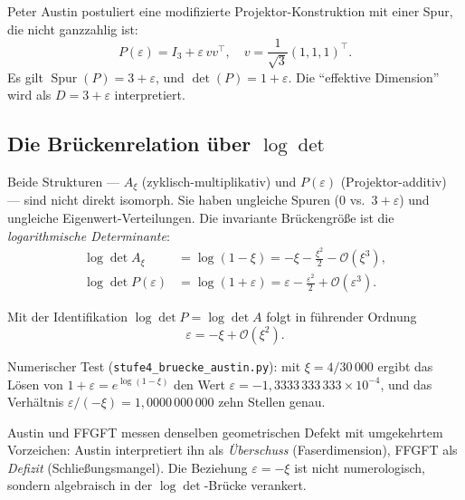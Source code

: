 Peter Austin postuliert eine modifizierte Projektor-Konstruktion mit einer Spur, die nicht ganzzahlig ist:
\begin{equation}
P(\varepsilon) = I_3 + \varepsilon\, vv^\top, \quad v = \frac{1}{\sqrt{3}}(1, 1, 1)^\top.
\label{eq:Paustin}
\end{equation}
Es gilt \(\operatorname{Spur}(P) = 3 + \varepsilon\), und \(\det(P) = 1 + \varepsilon\). Die ``effektive Dimension'' wird als \(D = 3 + \varepsilon\) interpretiert.

\subsection[Die Brückenrelation über log det]{Die Brückenrelation über \(\log \det\)}

Beide Strukturen — \(A_\xi\) (zyklisch-multiplikativ) und \(P(\varepsilon)\) (Projektor-additiv) — sind nicht direkt isomorph. Sie haben ungleiche Spuren (\(0\) vs.~\(3+\varepsilon\)) und ungleiche Eigenwert-Verteilungen. Die invariante Brückengröße ist die \emph{logarithmische Determinante}:
\begin{align}
\log \det A_\xi &= \log(1 - \xi) = -\xi - \frac{\xi^2}{2} - \mathcal{O}(\xi^3),\\
\log \det P(\varepsilon) &= \log(1 + \varepsilon) = \varepsilon - \frac{\varepsilon^2}{2} + \mathcal{O}(\varepsilon^3).
\end{align}

\begin{keyresult}
Mit der Identifikation \(\log \det P = \log \det A\) folgt in führender Ordnung
\begin{equation}
\boxed{\varepsilon = -\xi + \mathcal{O}(\xi^2).}
\label{eq:eps_xi}
\end{equation}
\end{keyresult}

Numerischer Test (\texttt{stufe4\_bruecke\_austin.py}): mit \(\xi = 4/30\,000\) ergibt das Lösen von \(1 + \varepsilon = e^{\log(1-\xi)}\) den Wert \(\varepsilon = -1{,}3333\,333\,333 \times 10^{-4}\), und das Verhältnis \(\varepsilon / (-\xi) = 1{,}0000\,000\,000\) zehn Stellen genau.

\begin{interpretation}
Austin und FFGFT messen denselben geometrischen Defekt mit umgekehrtem Vorzeichen: Austin interpretiert ihn als \emph{Überschuss} (Faserdimension), FFGFT als \emph{Defizit} (Schließungsmangel). Die Beziehung \(\varepsilon = -\xi\) ist nicht numerologisch, sondern algebraisch in der \(\log\det\)-Brücke verankert.
\end{interpretation}

